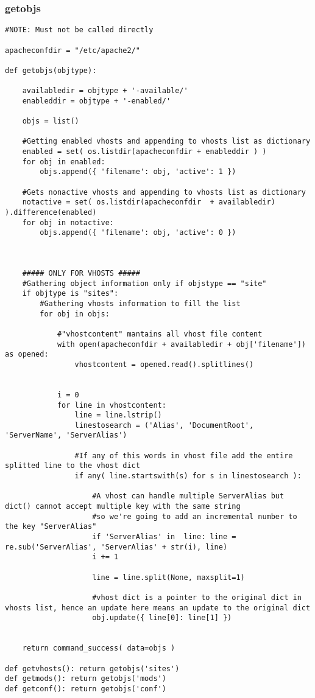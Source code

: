 \documentclass[11pt]{article}
\begin{document}
\subsubsection{getobjs}\label{getobjs}
\begin{lstlisting}
#NOTE: Must not be called directly

apacheconfdir = "/etc/apache2/"

def getobjs(objtype):

    availabledir = objtype + '-available/'
    enableddir = objtype + '-enabled/'

    objs = list()

    #Getting enabled vhosts and appending to vhosts list as dictionary
    enabled = set( os.listdir(apacheconfdir + enableddir ) )
    for obj in enabled:
        objs.append({ 'filename': obj, 'active': 1 })

    #Gets nonactive vhosts and appending to vhosts list as dictionary
    notactive = set( os.listdir(apacheconfdir  + availabledir) ).difference(enabled)
    for obj in notactive:
        objs.append({ 'filename': obj, 'active': 0 })



    ##### ONLY FOR VHOSTS #####
    #Gathering object information only if objstype == "site"
    if objtype is "sites":
        #Gathering vhosts information to fill the list
        for obj in objs:

            #"vhostcontent" mantains all vhost file content
            with open(apacheconfdir + availabledir + obj['filename']) as opened:
                vhostcontent = opened.read().splitlines()

            
            i = 0
            for line in vhostcontent:
                line = line.lstrip()
                linestosearch = ('Alias', 'DocumentRoot', 'ServerName', 'ServerAlias')

                #If any of this words in vhost file add the entire splitted line to the vhost dict
                if any( line.startswith(s) for s in linestosearch ):

                    #A vhost can handle multiple ServerAlias but dict() cannot accept multiple key with the same string
                    #so we're going to add an incremental number to the key "ServerAlias"
                    if 'ServerAlias' in  line: line = re.sub('ServerAlias', 'ServerAlias' + str(i), line)
                    i += 1

                    line = line.split(None, maxsplit=1)

                    #vhost dict is a pointer to the original dict in vhosts list, hence an update here means an update to the original dict
                    obj.update({ line[0]: line[1] })


    return command_success( data=objs )

def getvhosts(): return getobjs('sites')
def getmods(): return getobjs('mods')
def getconf(): return getobjs('conf')
\end{lstlisting}
\end{document}
